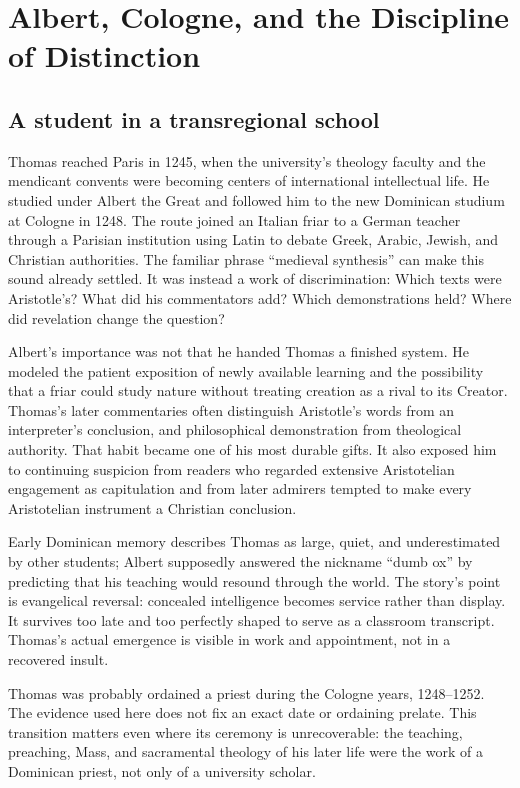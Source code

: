 \section{Albert, Cologne, and the Discipline of Distinction}

\subsection{A student in a transregional school}

Thomas reached Paris in 1245, when the university's theology faculty and the
mendicant convents were becoming centers of international intellectual life.
He studied under Albert the Great and followed him to the new Dominican
studium at Cologne in 1248.  The route joined an Italian friar to a German
teacher through a Parisian institution using Latin to debate Greek, Arabic,
Jewish, and Christian authorities.  The familiar phrase ``medieval synthesis''
can make this sound already settled.  It was instead a work of discrimination:
Which texts were Aristotle's?  What did his commentators add?  Which
demonstrations held?  Where did revelation change the question?

Albert's importance was not that he handed Thomas a finished system.  He
modeled the patient exposition of newly available learning and the possibility
that a friar could study nature without treating creation as a rival to its
Creator.  Thomas's later commentaries often distinguish Aristotle's words from
an interpreter's conclusion, and philosophical demonstration from theological
authority.  That habit became one of his most durable gifts.  It also exposed
him to continuing suspicion from readers who regarded extensive Aristotelian
engagement as capitulation and from later admirers tempted to make every
Aristotelian instrument a Christian conclusion.

Early Dominican memory describes Thomas as large, quiet, and underestimated by
other students; Albert supposedly answered the nickname ``dumb ox'' by
predicting that his teaching would resound through the world.  The story's
point is evangelical reversal: concealed intelligence becomes service rather
than display.  It survives too late and too perfectly shaped to serve as a
classroom transcript.  Thomas's actual emergence is visible in work and
appointment, not in a recovered insult.

Thomas was probably ordained a priest during the Cologne years, 1248--1252.
The evidence used here does not fix an exact date or ordaining prelate.  This
transition matters even where its ceremony is unrecoverable: the teaching,
preaching, Mass, and sacramental theology of his later life were the work of a
Dominican priest, not only of a university scholar.

